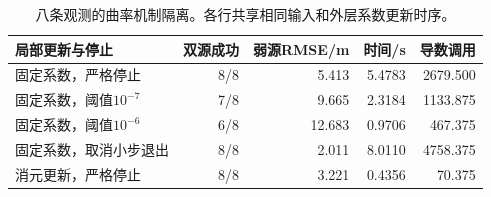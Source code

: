 \begin{table}[pos=htbp]\centering\small
\caption{八条观测的曲率机制隔离。各行共享相同输入和外层系数更新时序。}\label{tab:mechanism}
\begin{tabular}{@{}lrrrr@{}}\toprule
局部更新与停止 & 双源成功 & 弱源RMSE/m & 时间/s & 导数调用\\\midrule
固定系数，严格停止 & 8/8 & 5.413 & 5.4783 & 2679.500\\
固定系数，阈值$10^{-7}$ & 7/8 & 9.665 & 2.3184 & 1133.875\\
固定系数，阈值$10^{-6}$ & 6/8 & 12.683 & 0.9706 & 467.375\\
固定系数，取消小步退出 & 8/8 & 2.011 & 8.0110 & 4758.375\\
消元更新，严格停止 & 8/8 & 3.221 & 0.4356 & 70.375\\
\bottomrule\end{tabular}\end{table}

